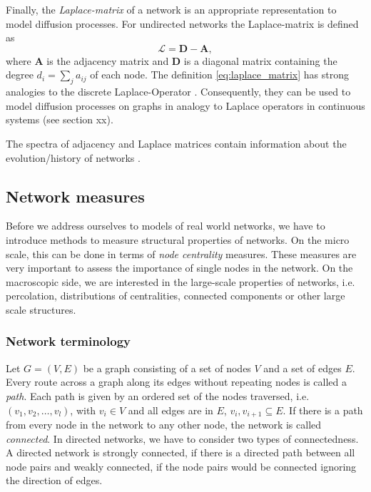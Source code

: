 \documentclass[openright,twoside,headsepline]{scrbook}
\begin{document}
Finally, the \emph{Laplace-matrix} of a network is an appropriate representation to model diffusion processes.
For undirected networks the Laplace-matrix is defined as
\begin{equation}\label{eq:laplace_matrix}
\mathcal{L}=\mathbf{D}-\mathbf{A},
\end{equation}
where $\mathbf{A}$ is the adjacency matrix and $\mathbf{D}$ is a diagonal matrix containing the degree $d_i=\sum _j a_{ij}$ of each node.
The definition \eqref{eq:laplace_matrix} has strong analogies to the discrete Laplace-Operator \citep{Press:1992}.
Consequently, they can be used to model diffusion processes on graphs in analogy to Laplace operators in continuous systems (see section xx).

The spectra of adjacency and Laplace matrices contain information about the evolution/history of networks \citep{Banerjee2009}.


\subsection{Network measures}
Before we address ourselves to models of real world networks, we have to introduce methods to measure structural properties of networks.
On the micro scale, this can be done in terms of \emph{node centrality} measures.
These measures are very important to assess the importance of single nodes in the network.
On the macroscopic side, we are interested in the large-scale properties of networks, i.e. percolation, distributions of centralities, connected components or other large scale structures.

\subsubsection{Network terminology}
Let $G=(V,E)$ be a graph consisting of a set of nodes $V$ and a set of edges $E$.
Every route across a graph along its edges without repeating nodes is called a \emph{path}.
Each path is given by an ordered set of the nodes traversed, i.e. $(v_1,v_2,\dots ,v_l)$, with $v_i \in V$ and all edges are in $E$, $v_i,v_{i+1} \subseteq E$.
If there is a path from every node in the network to any other node, the network is called \emph{connected}.
In directed networks, we have to consider two types of connectedness.
A directed network is strongly connected, if there is a directed path between all node pairs and weakly connected, if the node pairs would be connected ignoring the direction of edges.
\end{document}
